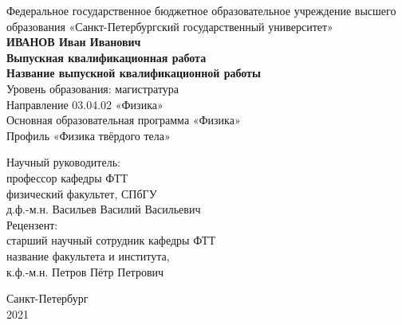 \thispagestyle{empty}
\begin{center}
 Федеральное государственное бюджетное образовательное учреждение высшего образования «Санкт-Петербургский государственный университет»\\
  \vspace{6cm}
  \textbf{ИВАНОВ Иван Иванович}\\
  \textbf{Выпускная квалификационная работа}\\
  \textbf{Название выпускной квалификационной работы}\\
  \vspace{1.5cm}
  Уровень образования: магистратура\\
  Направление 03.04.02 «Физика»\\
  Основная образовательная программа «Физика»\\
  Профиль «Физика твёрдого тела»\\
  \vspace{1.5cm}
\end{center}
\begin{flushright}
  Научный руководитель: \\
  профессор кафедры ФТТ \\
  физический факультет, СПбГУ\\
  д.ф.-м.н. Васильев Василий Васильевич\\
  \vspace{1cm}
  Рецензент:  \\
  старший научный сотрудник кафедры ФТТ \\
  название факультета и института,  \\
  к.ф.-м.н. Петров Пётр Петрович
\end{flushright}
\vfill
\begin{center}
  Санкт-Петербург\\
  2021
\end{center}
